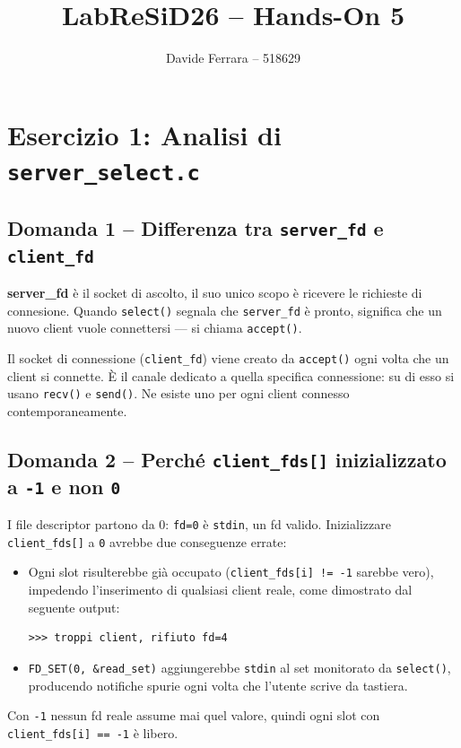 \documentclass[a4paper,12pt]{article}
\title{LabReSiD26 -- Hands-On 5}
\author{Davide Ferrara -- 518629}
\date{}
\begin{document}
\maketitle

\section{Esercizio 1: Analisi di \texttt{server\_select.c}}

\subsection*{Domanda 1 -- Differenza tra \texttt{server\_fd} e \texttt{client\_fd}}

\textbf{server\_fd} è il socket di ascolto,
il suo unico scopo è ricevere le richieste di connesione.
Quando \texttt{select()} segnala che \texttt{server\_fd} è pronto,
significa che un nuovo client vuole connettersi --- si chiama \texttt{accept()}.

Il socket di connessione (\texttt{client\_fd}) viene creato da \texttt{accept()} ogni volta
che un client si connette. È il canale dedicato a quella specifica connessione: su di esso
si usano \texttt{recv()} e \texttt{send()}. Ne esiste uno per ogni client connesso
contemporaneamente.

\subsection*{Domanda 2 -- Perché \texttt{client\_fds[]} inizializzato a \texttt{-1} e non \texttt{0}}

I file descriptor partono da 0: \texttt{fd=0} è \texttt{stdin}, un fd valido.
Inizializzare \texttt{client\_fds[]} a \texttt{0} avrebbe due conseguenze errate:
\begin{itemize}
  \item Ogni slot risulterebbe già occupato (\texttt{client\_fds[i] != -1} sarebbe vero),
        impedendo l'inserimento di qualsiasi client reale, come dimostrato 
        dal seguente output:
        \begin{lstlisting}
>>> troppi client, rifiuto fd=4
        \end{lstlisting}
  \item \texttt{FD\_SET(0, \&read\_set)} aggiungerebbe \texttt{stdin} al set monitorato da
        \texttt{select()}, producendo notifiche spurie ogni volta che l'utente scrive da
        tastiera.
\end{itemize}
Con \texttt{-1} nessun fd reale assume mai quel valore, quindi ogni slot con
\texttt{client\_fds[i] == -1} è libero.
\end{document}
